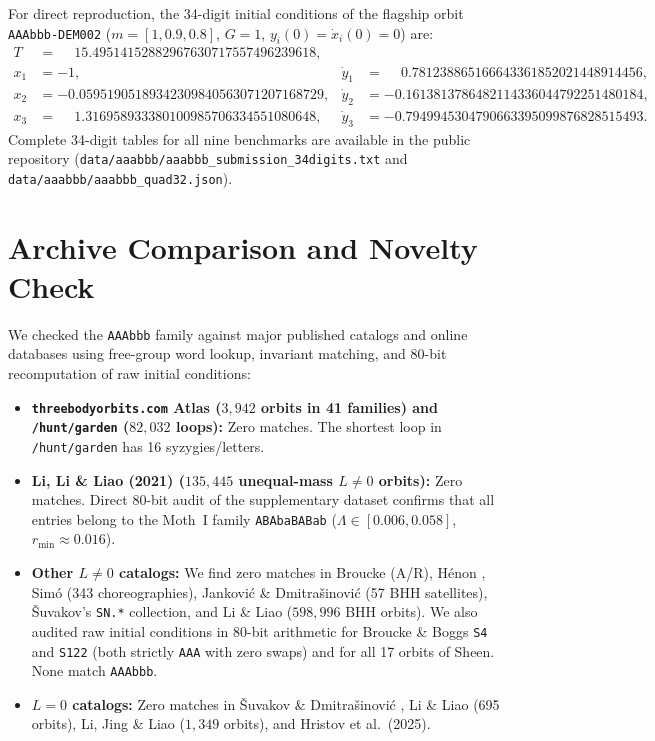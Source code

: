 \documentclass[11pt,a4paper]{article}
\begin{document}
For direct reproduction, the 34-digit initial conditions of the flagship orbit \texttt{AAAbbb-DEM002} ($m = [1, 0.9, 0.8]$, $G = 1$, $y_i(0) = \dot{x}_i(0) = 0$) are:
\begin{align*}
T &= \phantom{-}15.49514152882967630717557496239618, \\
x_1 &= -1, & \dot{y}_1 &= \phantom{-}0.781238865166643361852021448914456, \\
x_2 &= -0.05951905189342309840563071207168729, & \dot{y}_2 &= -0.1613813786482114336044792251480184, \\
x_3 &= \phantom{-}1.316958933380100985706334551080648, & \dot{y}_3 &= -0.7949945304790663395099876828515493.
\end{align*}
Complete 34-digit tables for all nine benchmarks are available in the public repository (\texttt{data/aaabbb/aaabbb\_submission\_34digits.txt} and \texttt{data/aaabbb/aaabbb\_quad32.json}).

\section{Archive Comparison and Novelty Check}
We checked the \texttt{AAAbbb} family against major published catalogs and online databases using free-group word lookup, invariant matching, and 80-bit recomputation of raw initial conditions:
\begin{itemize}
  \item \textbf{\texttt{threebodyorbits.com} Atlas ($3{,}942$ orbits in 41 families) and \texttt{/hunt/garden} ($82{,}032$ loops):} Zero matches. The shortest loop in \texttt{/hunt/garden} has 16 syzygies/letters.
  \item \textbf{Li, Li \& Liao (2021) \cite{LiLiLiao2021} ($135{,}445$ unequal-mass $L \neq 0$ orbits):} Zero matches. Direct 80-bit audit of the supplementary dataset confirms that all entries belong to the Moth~I family \texttt{ABAbaBABab} ($\Lambda \in [0.006, 0.058]$, $r_{\min} \approx 0.016$).
  \item \textbf{Other $L \neq 0$ catalogs:} We find zero matches in Broucke \cite{Broucke1975} (A/R), H\'enon \cite{Henon1976}, Sim\'o (343 choreographies), Jankovi\'c \& Dmitra\v{s}inovi\'c \cite{Jankovic2016} (57 BHH satellites), \v{S}uvakov's \texttt{SN.*} collection, and Li \& Liao \cite{LiLiao2020} ($598{,}996$ BHH orbits). We also audited raw initial conditions in 80-bit arithmetic for Broucke \& Boggs \cite{BrouckeBoggs1975} \texttt{S4} and \texttt{S122} (both strictly \texttt{AAA} with zero swaps) and for all 17 orbits of Sheen. None match \texttt{AAAbbb}.
  \item \textbf{$L = 0$ catalogs:} Zero matches in \v{S}uvakov \& Dmitra\v{s}inovi\'c \cite{Suvakov2013}, Li \& Liao \cite{LiLiao2017} (695 orbits), Li, Jing \& Liao \cite{LiJingLiao2018} ($1{,}349$ orbits), and Hristov et al.\ (2025).
\end{itemize}
\end{document}
